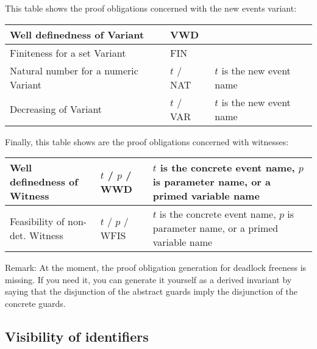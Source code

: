 This table shows the proof obligations concerned with the new events variant:

\begin{center}
    \begin{tabular}{| p{6cm} | p{3cm} | p{5cm} |}
    \hline
	Well definedness of Variant & VWD & \\ \hline
	Finiteness for a set Variant & FIN &  \\ \hline
	Natural number for a numeric Variant & $t$  / NAT & $t$ is the new event name \\ \hline
	Decreasing of Variant & $t$  / VAR & $t$ is the new event name  \\ \hline
    \end{tabular}
\end{center}

Finally, this table shows are the proof obligations concerned with witnesses:

\begin{center}
    \begin{tabular}{| p{6cm} | p{3cm} | p{5cm} |}
    \hline
	Well definedness of Witness & $t$  / $p$  / WWD & $t$ is the concrete event name, $p$ is parameter name, or a primed variable name \\ \hline
	Feasibility of non-det. Witness & $t$  / $p$  / WFIS & $t$ is the concrete event name, $p$ is parameter name, or a primed variable name \\ \hline
    \end{tabular}
\end{center}

Remark: At the moment, the proof obligation generation for deadlock freeness is missing. If you need it, you can generate it yourself as a derived invariant by saying that the disjunction of the abstract guards imply the disjunction of the concrete guards.

\subsection{Visibility of identifiers}
\label{visibility_of_identifiers}

